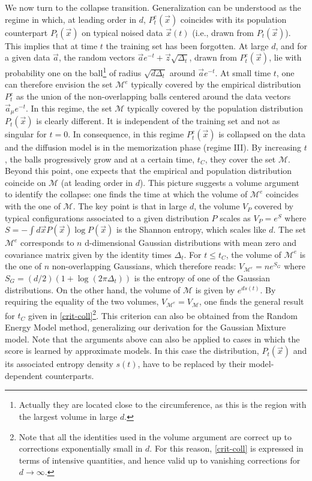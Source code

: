 \documentclass[10pt,twocolumn]{article}
\newcommand{\vx}{\vec x}
\newcommand{\va}{\vec a}
\begin{document}
We now turn to the collapse transition. Generalization can be understood as the regime in which, at leading order in $d$, $P_t^e(\vec x)$ coincides with its population counterpart $P_t(\vec x)$ on typical noised data $\vec x(t)$ (i.e., drawn from $P_t(\vec x)$). This implies that at time $t$ the training set has been forgotten. At large $d$, and for a given data $\vec a$, the random vectors $\vec a e^{-t}+\vec z \sqrt{\Delta_t}$, drawn from $P_t^e(\vec x)$, lie with probability one on the ball\footnote{Actually they are located close to the circumference, as this is the region with the largest volume in large $d$.} of radius $\sqrt{d\Delta_t}$ around $\vec a e^{-t}$. At small time $t$, one can therefore envision the set ${\mathcal M}^e$ typically covered by the empirical distribution $P^e_t$ as the union of the non-overlapping balls centered around the data vectors $\va_\mu e^{-t}$. In this regime, the set ${\mathcal M}$ typically covered by the population distribution $P_t(\vec x)$ is clearly different. It is independent of the training set and not as singular for $t=0$. In consequence, in this regime $P_t^e(\vec x)$ is collapsed on the data and the diffusion model is in the memorization phase (regime III). 
By increasing $t$, the balls progressively grow and at a certain time, $t_C$, they cover the set ${\mathcal M}$. Beyond this point, one expects that the empirical and population distribution coincide on  ${\mathcal M}$ (at leading order in $d$). This picture suggests a volume argument to identify the collapse: one finds the time at which the volume of ${\mathcal M}^e$ coincides with the one of ${\mathcal M}$. The key point is that in large $d$, the volume $V_P$ covered by typical configurations associated to a given distribution $P$ scales as $V_P= e^{S}$ where $S=-\int d\vx P(\vx) \log P(\vx)$ is the Shannon entropy, which scales like $d$. The set ${\mathcal M}^e$ corresponds to $n$ d-dimensional Gaussian distributions with mean zero and covariance matrix  given by the identity times $\Delta_t$. For $t\le t_C$, the volume of ${\mathcal M}^e$ is the one of $n$ non-overlapping Gaussians, which therefore reads:
$  V_{{\mathcal M}^e}=n e^{S_G} $ where 
$  S_G=(d/2)(1+\log (2\pi \Delta_t)) $ is the entropy of one of the  Gaussian distributions. On the other hand, the volume of ${\mathcal M}$ is given by $e^{d s(t)}$. 
By requiring the equality of the two volumes, $V_{{\mathcal M}^e}=V_{{\mathcal M}}$, one finds the general result for $t_C$ given in \eqref{crit-coll}\footnote{Note that all the identities used in the volume argument are correct up to corrections exponentially small in $d$. For this reason, \eqref{crit-coll} is expressed in terms of intensive quantities, and hence valid up to vanishing corrections for $d\rightarrow \infty$.}. This criterion can also be obtained from the Random Energy Model method, generalizing our derivation for the Gaussian Mixture model. Note that the arguments above can also be applied to cases in which the score is learned by approximate models. In this case the distribution, $P_t(\vx)$ and its associated entropy density $s(t)$, have to be replaced by their model-dependent counterparts. \\
\end{document}
